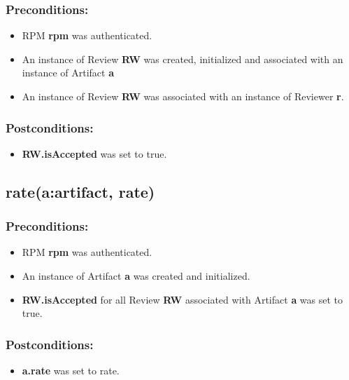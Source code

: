 \subsubsection*{Preconditions:}
\begin{itemize}
\itemsep-1.5em 
    \item RPM \textbf{rpm} was authenticated.
    \item An instance of Review \textbf{RW} was created, initialized and associated with an instance of Artifact \textbf{a}
    \item An instance of Review \textbf{RW} was associated with an instance of Reviewer \textbf{r}.
  
   
\end{itemize}



\subsubsection*{Postconditions:}
\begin{itemize}
\itemsep-1.5em 
   \item \textbf{RW.isAccepted} was set to true.

\end{itemize}





\subsection*{rate(a:artifact, rate)}

\subsubsection*{Preconditions:}
\begin{itemize}
\itemsep-1.5em 
    \item RPM \textbf{rpm} was authenticated.
    \item An instance of Artifact \textbf{a} was created and initialized.
    \item \textbf{RW.isAccepted} for all Review \textbf{RW} associated with Artifact \textbf{a} was set to true.
    
  
   
\end{itemize}



\subsubsection*{Postconditions:}
\begin{itemize}
\itemsep-1.5em 
   \item \textbf{a.rate} was set to rate. 

\end{itemize}






